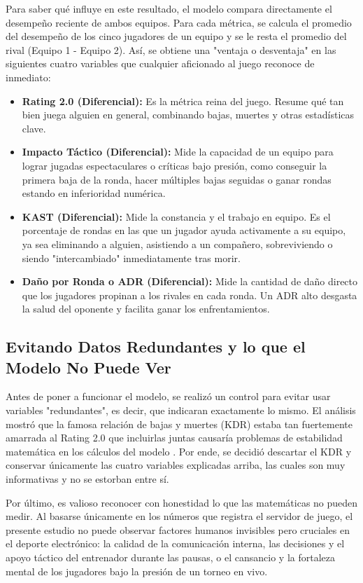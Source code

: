 \documentclass[twocolumn,10pt]{article}
\begin{document}
Para saber qué influye en este resultado, el modelo compara directamente el desempeño reciente de ambos equipos. Para cada métrica, se calcula el promedio del desempeño de los cinco jugadores de un equipo y se le resta el promedio del rival (Equipo 1 - Equipo 2). Así, se obtiene una "ventaja o desventaja" en las siguientes cuatro variables que cualquier aficionado al juego reconoce de inmediato:
\begin{itemize}[leftmargin=*]
    \item \textbf{Rating 2.0 (Diferencial):} Es la métrica reina del juego. Resume qué tan bien juega alguien en general, combinando bajas, muertes y otras estadísticas clave.
    \item \textbf{Impacto Táctico (Diferencial):} Mide la capacidad de un equipo para lograr jugadas espectaculares o críticas bajo presión, como conseguir la primera baja de la ronda, hacer múltiples bajas seguidas o ganar rondas estando en inferioridad numérica.
    \item \textbf{KAST (Diferencial):} Mide la constancia y el trabajo en equipo. Es el porcentaje de rondas en las que un jugador ayuda activamente a su equipo, ya sea eliminando a alguien, asistiendo a un compañero, sobreviviendo o siendo "intercambiado" inmediatamente tras morir.
    \item \textbf{Daño por Ronda o ADR (Diferencial):} Mide la cantidad de daño directo que los jugadores propinan a los rivales en cada ronda. Un ADR alto desgasta la salud del oponente y facilita ganar los enfrentamientos.
\end{itemize}

\subsection{Evitando Datos Redundantes y lo que el Modelo No Puede Ver}

Antes de poner a funcionar el modelo, se realizó un control para evitar usar variables "redundantes", es decir, que indicaran exactamente lo mismo. El análisis mostró que la famosa relación de bajas y muertes (KDR) estaba tan fuertemente amarrada al Rating 2.0 que incluirlas juntas causaría problemas de estabilidad matemática en los cálculos del modelo \cite{igual2017introduction}. Por ende, se decidió descartar el KDR y conservar únicamente las cuatro variables explicadas arriba, las cuales son muy informativas y no se estorban entre sí.

Por último, es valioso reconocer con honestidad lo que las matemáticas no pueden medir. Al basarse únicamente en los números que registra el servidor de juego, el presente estudio no puede observar factores humanos invisibles pero cruciales en el deporte electrónico: la calidad de la comunicación interna, las decisiones y el apoyo táctico del entrenador durante las pausas, o el cansancio y la fortaleza mental de los jugadores bajo la presión de un torneo en vivo.
\end{document}
